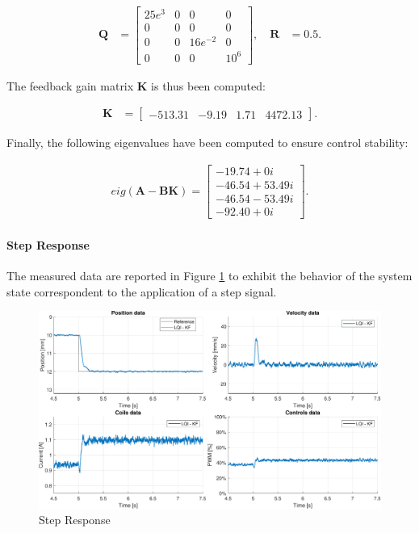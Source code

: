 \begin{equation}
    \begin{aligned}
        \mathbf{Q} & =
        \begin{bmatrix}
            25e^3 & 0 & 0        & 0      \\
            0     & 0 & 0        & 0      \\
            0     & 0 & 16e^{-2} & 0      \\
            0     & 0 & 0        & 10^{6}
        \end{bmatrix},  \quad
        \mathbf{R} & = 0.5.
    \end{aligned}
\end{equation}

The feedback gain matrix  $\mathbf{K}$ is thus been computed:

\begin{equation}
    \begin{aligned}
        \mathbf{K} & =
        \begin{bmatrix}
            -513.31 & -9.19 & 1.71 & 4472.13
        \end{bmatrix}.
    \end{aligned}
\end{equation}

Finally, the following eigenvalues have been computed to ensure control stability:

\begin{equation}
    \begin{aligned}
        eig\mathbf{(A-BK)}  =
        \begin{bmatrix}
            -19.74 + 0i     \\
            -46.54 + 53.49i \\
            -46.54 - 53.49i \\
            -92.40 + 0i
        \end{bmatrix}.
    \end{aligned}
\end{equation}

\paragraph{Step Response} The measured data are reported in Figure \ref{fig:Step Response} to exhibit the behavior of the system state correspondent to the application of a step signal.

\begin{figure}[H]
    \centering
    \includegraphics[width=1\linewidth]{./img/MATLAB/results/step_LQI_KF.pdf}
    \caption{Step Response}
    \label{fig:Step Response}
\end{figure}
